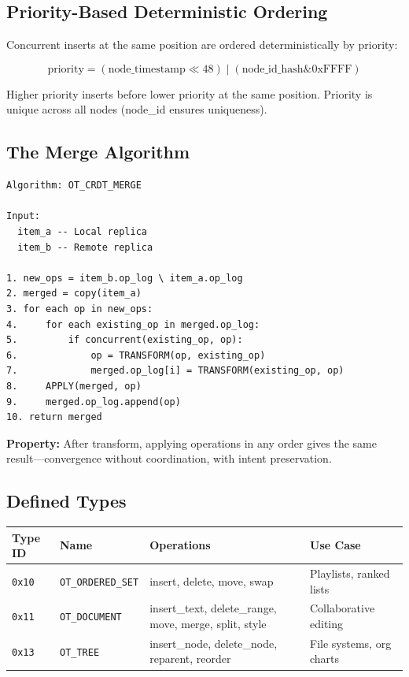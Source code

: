 \documentclass[11pt,a4paper]{article}
\begin{document}
\subsection{Priority-Based Deterministic Ordering}

Concurrent inserts at the same position are ordered deterministically by priority:

\[
\text{priority} = (\text{node\_timestamp} \ll 48) \mid (\text{node\_id\_hash} \mathbin{\&} \text{0xFFFF})
\]

Higher priority inserts before lower priority at the same position. Priority is unique across all nodes (node\_id ensures uniqueness).

\subsection{The Merge Algorithm}

\begin{lstlisting}
Algorithm: OT_CRDT_MERGE

Input:
  item_a -- Local replica
  item_b -- Remote replica

1. new_ops = item_b.op_log \ item_a.op_log
2. merged = copy(item_a)
3. for each op in new_ops:
4.     for each existing_op in merged.op_log:
5.         if concurrent(existing_op, op):
6.             op = TRANSFORM(op, existing_op)
7.             merged.op_log[i] = TRANSFORM(existing_op, op)
8.     APPLY(merged, op)
9.     merged.op_log.append(op)
10. return merged
\end{lstlisting}

\textbf{Property:} After transform, applying operations in any order gives the same result---convergence without coordination, with intent preservation.

\subsection{Defined Types}

\vspace{4pt}
\begin{tabularx}{\textwidth}{l>{\hsize=0.5\hsize}X>{\hsize=1.5\hsize}ll}
\toprule
\textbf{Type ID} & \textbf{Name} & \textbf{Operations} & \textbf{Use Case} \\
\midrule
\texttt{0x10} & \texttt{OT\_ORDERED\_SET} & insert, delete, move, swap & Playlists, ranked lists \\
\texttt{0x11} & \texttt{OT\_DOCUMENT} & insert\_text, delete\_range, move, merge, split, style & Collaborative editing \\
\texttt{0x13} & \texttt{OT\_TREE} & insert\_node, delete\_node, reparent, reorder & File systems, org charts \\
\bottomrule
\end{tabularx}
\end{document}
